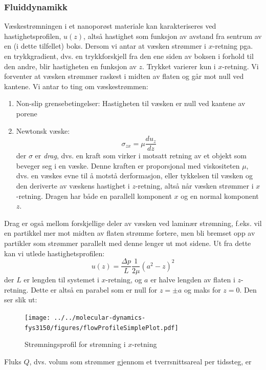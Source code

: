 \documentclass[english, a4paper]{article}
\begin{document}
\subsubsection{Fluiddynamikk}
Væskestrømningen i et nanoporøst materiale kan karakteriseres ved hastighetsprofilen, $u(z)$, 
altså hastighet som funksjon av avstand fra sentrum av en (i dette tilfellet) boks. 
Dersom vi antar at væsken strømmer i $x$-retning pga. en trykkgradient, dvs. en trykkforskjell
fra den ene siden av boksen i forhold til den andre, blir hastigheten en funksjon av $z$. Trykket varierer
kun i $x$-retning. Vi forventer at væsken strømmer raskest i midten av flaten og går mot null
ved kantene. Vi antar to ting om væskestrømmen:
\begin{enumerate}
 \item Non-slip grensebetingelser: Hastigheten til væsken er null ved kantene av porene
 \item Newtonsk væske:
 \begin{equation}
  \sigma_{zx} = \mu \frac{du_z}{dz}
 \end{equation}
 der $\sigma$ er \textit{drag}, dvs. en kraft som virker i motsatt retning av et objekt som beveger seg i 
 en væske. Denne kraften er proporsjonal med viskositeten $\mu$, dvs. en væskes evne til å motstå
 derformasjon, eller tykkelsen til væsken og den deriverte av væskens hastighet i $z$-retning, altså
 når væsken strømmer i $x$-retning. Dragen har både en parallell komponent $x$ og en normal komponent $z$.
\end{enumerate}
Drag er også mellom forskjellige deler av væsken ved laminær strømning, f.eks. vil en partikkel
mer mot midten av flaten strømme fortere, men bli bremset opp av partikler som strømmer parallelt med
denne lenger ut mot sidene. Ut fra dette kan vi utlede hastighetsprofilen:
\begin{equation}
 u(z) = \frac{\Delta p}{L}\frac{1}{2\mu} (a^2 - z)^2
\end{equation}
der $L$ er lengden til systemet i $x$-retning, og $a$ er halve lengden av flaten i $z$-retning. 
Dette er altså en parabel som er null for $z = \pm a$ og maks for $z=0$. Den ser slik ut:
\begin{figure}[H]
  \begin{center}
  \texttt{[image: ../../molecular-dynamics-fys3150/figures/flowProfileSimplePlot.pdf]}
  \caption{Strømningsprofil for strømning i $x$-retning}
  \label{fig:fig6}
  \end{center}
\end{figure}
Fluks $Q$, dvs. volum som strømmer gjennom et tverrsnittsareal per tidssteg, er
\end{document}
